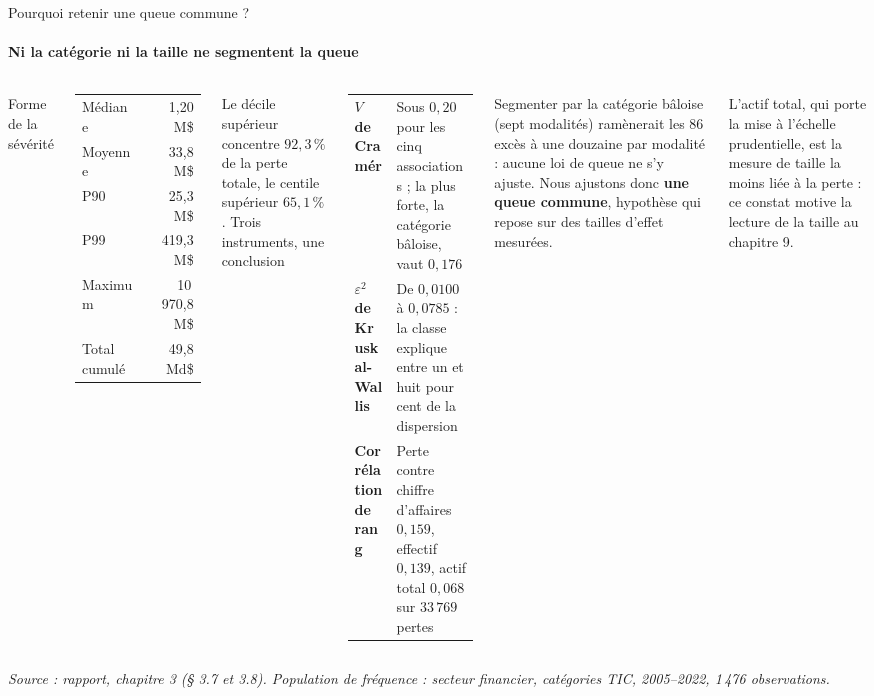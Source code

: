 \documentclass[aspectratio=169,10pt,t]{beamer}
\newcommand{\source}[1]{\par\vfill{\tiny\color{gris}\textit{Source : #1}}\par\vspace{-1mm}}
\renewcommand{\arraystretch}{1.25}
\begin{document}
\begin{frame}{Pourquoi retenir une queue commune ?}
  \framesubtitle{\etabli Ni la catégorie ni la taille ne segmentent la queue}
  \begin{columns}[T,onlytextwidth]
    \footnotesize
    {\editorial\normalsize Forme de la sévérité}\par\vspace{1.5mm}
    \renewcommand{\arraystretch}{1.12}
    \begin{tabular}{@{}lr@{}}
      \toprule
      Médiane & 1,20 M\$ \\
      Moyenne & 33,8 M\$ \\
      P90 & 25,3 M\$ \\
      P99 & 419,3 M\$ \\
      Maximum & 10\,970,8 M\$ \\
      Total cumulé & 49,8 Md\$ \\
      \bottomrule
    \end{tabular}\par\vspace{1.5mm}
    Le décile supérieur concentre $92{,}3\,\%$ de la perte totale, le centile supérieur $65{,}1\,\%$.
    \footnotesize
    {\editorial\normalsize Trois instruments, une conclusion}\par\vspace{1.5mm}
    \renewcommand{\arraystretch}{1.12}
    \begin{tabularx}{\linewidth}{@{}>{\bfseries}l Y@{}}
      \toprule
      $V$ de Cramér & Sous $0{,}20$ pour les cinq associations ; la plus forte, la catégorie bâloise, vaut $0{,}176$ \\
      $\varepsilon^2$ de Kruskal-Wallis & De $0{,}0100$ à $0{,}0785$ : la classe explique entre un et huit pour cent de la dispersion \\
      Corrélation de rang & Perte contre chiffre d'affaires $0{,}159$, effectif $0{,}139$, actif total $0{,}068$ sur $33\,769$ pertes \\
      \bottomrule
    \end{tabularx}\par\vspace{2mm}
    Segmenter par la catégorie bâloise (sept modalités) ramènerait les 86 excès à une douzaine par modalité : aucune loi de queue ne s'y ajuste. Nous ajustons donc \textbf{une queue commune}, hypothèse qui repose sur des tailles d'effet mesurées.\par\vspace{2mm}
    {\scriptsize L'actif total, qui porte la mise à l'échelle prudentielle, est la mesure de taille la moins liée à la perte : ce constat motive la lecture de la taille au chapitre 9.\par}
  \end{columns}
  \source{rapport, chapitre 3 (§ 3.7 et 3.8). Population de fréquence : secteur financier, catégories TIC, 2005--2022, 1\,476 observations.}
\end{frame}
\end{document}
